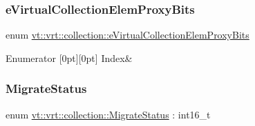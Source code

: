 \subsubsection{\texorpdfstring{e\+Virtual\+Collection\+Elem\+Proxy\+Bits}{eVirtualCollectionElemProxyBits}}
{\footnotesize\ttfamily enum \hyperlink{namespacevt_1_1vrt_1_1collection_a216d0b183a155808303b12c258f259a0}{vt\+::vrt\+::collection\+::e\+Virtual\+Collection\+Elem\+Proxy\+Bits}}

\begin{DoxyEnumFields}{Enumerator}
[0pt][0pt]{}\mbox{\label{namespacevt_1_1vrt_1_1collection_a216d0b183a155808303b12c258f259a0a0af778d966820c09e81e6d33599fa217}} 
Index&\\
\hline

\end{DoxyEnumFields}
\mbox{\label{namespacevt_1_1vrt_1_1collection_ad221ad8aea9e586689b4335f5bcd9804}} 
\subsubsection{\texorpdfstring{Migrate\+Status}{MigrateStatus}}
{\footnotesize\ttfamily enum \hyperlink{namespacevt_1_1vrt_1_1collection_ad221ad8aea9e586689b4335f5bcd9804}{vt\+::vrt\+::collection\+::\+Migrate\+Status} \+: int16\+\_\+t\hspace{0.3cm}{\ttfamily [strong]}}

